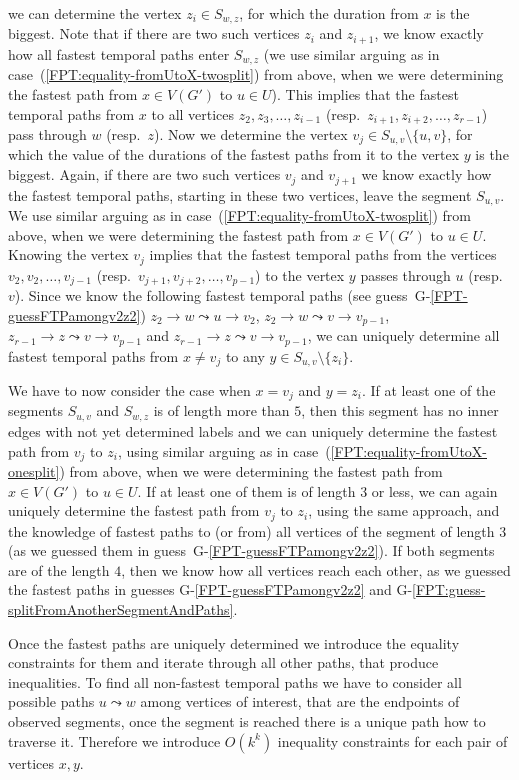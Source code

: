 \documentclass[11pt,a4paper]{article}
\theoremstyle{remark}
\theoremstyle{definition}
\begin{document}
\begin{enumerate}[(i)]
we can determine the vertex $z_i \in S_{w,z} $, for which the duration from $x$ is the biggest.
Note that if there are two such vertices $z_i$ and $z_{i+1}$, we know exactly how all fastest temporal paths enter $S_{w,z}$ 
(we use similar arguing as in case~(\ref{FPT:equality-fromUtoX-twosplit}) from above, when we were determining the fastest path from $x \in V(G')$ to $u \in U$).
This implies that the fastest temporal paths from $x$ to all vertices $z_2, z_3, \dots, z_{i-1}$ (resp.~$z_{i+1}, z_{i+2}, \dots, z_{r-1}$)  pass through $w$ (resp.~$z$).
Now we determine the vertex $v_j \in S_{u,v} \setminus \{u,v\}$,
for which the value of the durations of the fastest paths from it to the vertex $y$ is the biggest.
Again, if there are two such vertices $v_{j}$ and $v_{j+1}$ we know exactly how the fastest temporal paths, starting in these two vertices,
leave the segment $S_{u,v}$. 
We use similar arguing as in case~(\ref{FPT:equality-fromUtoX-twosplit}) from above, when we were determining the fastest path from $x \in V(G')$ to $u \in U$.
Knowing the vertex $v_j$
implies that the fastest temporal paths from the vertices $v_2, v_2, \dots, v_{j-1}$ (resp.~$v_{j+1}, v_{j+2}, \dots, v_{p-1}$) to the vertex $y$ passes through $u$ (resp.~$v$).
Since we know the following fastest temporal paths (see guess~G-\ref{FPT-guessFTPamongv2z2}) 
$z_2 \rightarrow w \leadsto u \rightarrow v_2$,
$z_2 \rightarrow w \leadsto v \rightarrow v_{p-1}$,
$z_{r-1} \rightarrow z \leadsto v \rightarrow v_{p-1}$ and
$z_{r-1} \rightarrow z \leadsto v \rightarrow v_{p-1}$,
we can uniquely determine all fastest temporal paths from $x \neq v_j$ to any $y \in S_{u,v} \setminus \{z_i\}$.

We have to now consider the case when 
$x = v_j$ and $y = z_i$.
If at least one of the segments $S_{u,v}$ and $S_{w,z}$ is of length more than $5$,
then this segment has no inner edges with not yet determined labels
and
we can uniquely determine the fastest path from $v_j$ to $z_i$,
using 
similar arguing as in case~(\ref{FPT:equality-fromUtoX-onesplit}) from above, when we were determining the fastest path from $x \in V(G')$ to $u \in U$.
If at least one of them is of length $3$ or less,
we can again uniquely determine the fastest path from $v_j$ to $z_i$, using the same approach, 
and the knowledge of fastest paths to (or from) all vertices of the segment of length $3$
(as we guessed them in guess~G-\ref{FPT-guessFTPamongv2z2}).
If both segments are of the length $4$, then we know how all vertices reach each other,
as we guessed the fastest paths in guesses G-\ref{FPT-guessFTPamongv2z2} and G-\ref{FPT:guess-splitFromAnotherSegmentAndPaths}.
\end{enumerate}
Once the fastest paths are uniquely determined we introduce the equality constraints for them
and iterate through all other paths, that produce inequalities.
To find all non-fastest temporal paths we have to consider all possible paths $u \leadsto w$ among vertices of interest, that are the endpoints of observed segments,
once the segment is reached there is a unique path how to traverse it.
Therefore we introduce $O(k^k)$ inequality constraints for each pair of vertices $x,y$.
\end{document}
